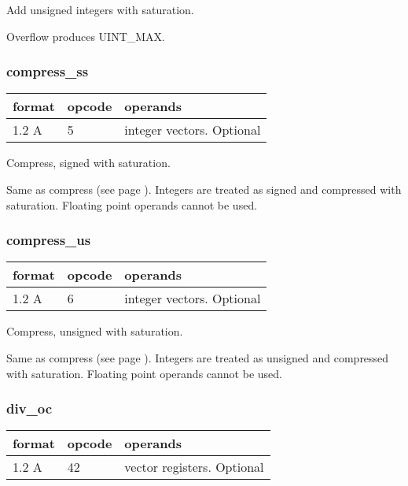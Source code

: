 \documentclass[forwardcom.tex]{subfiles}
\begin{document}
Add unsigned integers with saturation.

Overflow produces UINT\_MAX.

\subsubsection{compress\_ss}
\label{table:compressSsInstruction}
\begin{tabular}{|p{12mm}|p{12mm}|p{110mm}|}
\hline
\bfseries format & \bfseries opcode & \bfseries operands \\ \hline
1.2 A & 5 & integer vectors. Optional \\ \hline
\end{tabular}
\vspace{2mm}

Compress, signed with saturation.
\vspace{2mm}

Same as compress (see page \pageref{table:compressInstruction}). Integers are treated as signed and compressed with saturation. Floating point operands cannot be used.

\subsubsection{compress\_us}
\label{table:compressUsInstruction}
\begin{tabular}{|p{12mm}|p{12mm}|p{110mm}|}
\hline
\bfseries format & \bfseries opcode & \bfseries operands \\ \hline
1.2 A & 6 & integer vectors. Optional \\ \hline
\end{tabular}
\vspace{2mm}

Compress, unsigned with saturation.
\vspace{2mm}

Same as compress (see page \pageref{table:compressInstruction}). Integers are treated as unsigned and compressed with saturation. Floating point operands cannot be used.




\subsubsection{div\_oc}
\label{table:divOcInstruction}
\begin{tabular}{|p{12mm}|p{12mm}|p{110mm}|}
\hline
\bfseries format & \bfseries opcode & \bfseries operands \\ \hline
1.2 A & 42 & vector registers. Optional \\ \hline
\end{tabular}
\vspace{2mm}
\end{document}
